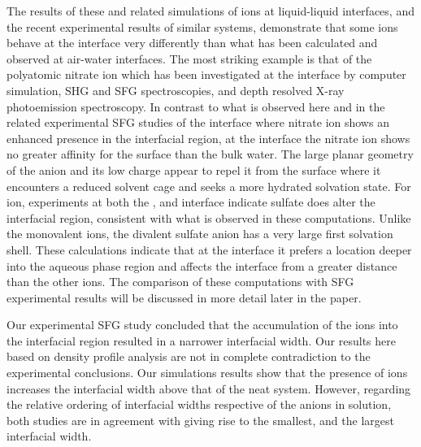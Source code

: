 The results of these and related simulations of ions at liquid-liquid interfaces, and the recent experimental results of similar systems, demonstrate that some ions behave at the \ctcwat interface very differently than what has been calculated and observed at air-water interfaces.\cite{Wick2006,Wick2007a,Jungwirth2006a} The most striking example is that of the polyatomic nitrate ion which has been investigated at the \airwat interface by computer simulation,\cite{Miller2009,Thomas2007} SHG and SFG spectroscopies,\cite{Otten2007,Schnitzer2000,Xu2009} and depth resolved X-ray photoemission spectroscopy.\cite{Brown2009} In contrast to what is observed here and in the related experimental SFG studies of the \ctcwat interface where nitrate ion shows an enhanced presence in the interfacial region, at the \airwat interface the nitrate ion shows no greater affinity for the surface than the bulk water. The large planar geometry of the \nit anion and its low charge appear to repel it from the \airwat surface where it encounters a reduced solvent cage and seeks a more hydrated solvation state. For \sul ion, experiments at both the \airwat,\cite{Gopalakrishnan2005} and \ctcwat interface indicate sulfate does alter the interfacial region, consistent with what is observed in these computations. Unlike the monovalent ions, the divalent sulfate anion has a very large first solvation shell. These calculations indicate that at the \ctcwat interface it prefers a location deeper into the aqueous phase region and affects the interface from a greater distance than the other ions. The comparison of these computations with SFG experimental results will be discussed in more detail later in the paper.

Our experimental SFG study concluded that the accumulation of the ions into the interfacial region resulted in a narrower interfacial width.\cite{McFearin2009} Our results here based on density profile analysis are not in complete contradiction to the experimental conclusions. Our simulations results show that the presence of ions increases the interfacial width above that of the neat \ctcwat system. However, regarding the relative ordering of interfacial widths respective of the anions in solution, both studies are in agreement with \nit giving rise to the smallest, and \sul the largest interfacial width.



